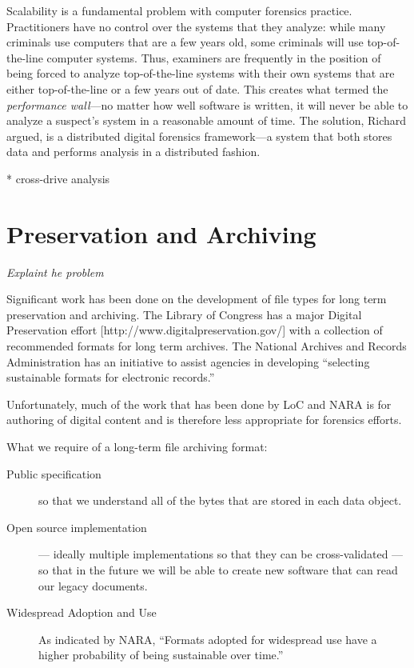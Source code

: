 \documentclass[11pt,letter]{article}
\newcommand{\citeN}[1]{\cite{#1}}
\begin{document}
Scalability is a fundamental problem with computer forensics
practice. Practitioners have no control over the systems that they
analyze: while many criminals use computers that are a few years old,
some criminals will use top-of-the-line computer systems. Thus,
examiners are frequently in the position of being forced to analyze
top-of-the-line systems with their own systems that are either
top-of-the-line or a few years out of date. This creates what
\citeN{dfrws2004:DrGoldenGRichardIII} 
termed the \emph{performance wall}---no matter how well software is
written, it will never be able to analyze a suspect's system in a
reasonable amount of time. The solution, Richard argued, is a
distributed digital forensics framework---a system that both stores
data and performs analysis in a distributed fashion.

* cross-drive analysis

\section{Preservation and Archiving}

\emph{Explaint he problem}

Significant work has been done on the development of file types for
long term preservation and archiving. The Library of Congress has a
major Digital Preservation effort
[http://www.digitalpreservation.gov/] with a collection of recommended
formats for long term archives.  The National Archives and Records
Administration has an initiative to assist agencies in developing
“selecting sustainable formats for electronic records.” 

Unfortunately, much of the work that has been done by LoC and NARA is
for authoring of digital content and is therefore less appropriate for
forensics efforts.

What we require of a long-term file archiving format:

\begin{description}
\item[Public specification] so that we understand all of the bytes that are stored in each data object.
\item[Open source implementation]— ideally multiple implementations so that they can be cross-validated — so that in the future we will be able to create new software that can read our legacy documents.
\item[Widespread Adoption and Use]  As indicated by NARA, “Formats adopted for widespread use have a higher probability of being sustainable over time.”   
\end{description}
\end{document}
